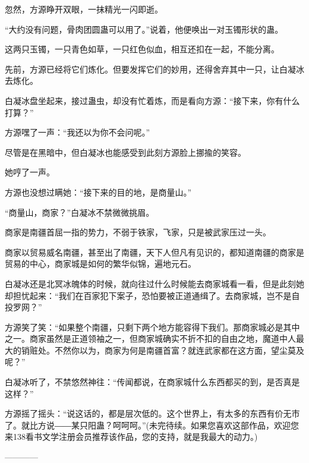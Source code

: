 \begin{this_body}
忽然，方源睁开双眼，一抹精光一闪即逝。

“大约没有问题，骨肉团圆蛊可以用了。”说着，他便唤出一对玉镯形状的蛊。

这两只玉镯，一只青色如草，一只红色似血，相互还扣在一起，不能分离。

先前，方源已经将它们炼化。但要发挥它们的妙用，还得舍弃其中一只，让白凝冰去炼化。

白凝冰盘坐起来，接过蛊虫，却没有忙着炼，而是看向方源：“接下来，你有什么打算？”

方源嘿了一声：“我还以为你不会问呢。”

尽管是在黑暗中，但白凝冰也能感受到此刻方源脸上挪揄的笑容。

她哼了一声。

方源也没想过瞒她：“接下来的目的地，是商量山。”

“商量山，商家？”白凝冰不禁微微挑眉。

商家是南疆首屈一指的势力，不弱于铁家，飞家，只是被武家压过一头。

商家以贸易威名南疆，甚至出了南疆，天下人但凡有见识的，都知道南疆的商家是贸易的中心，商家城是如何的繁华似锦，遍地元石。

白凝冰还是北冥冰魄体的时候，就向往过什么时候能去商家城看一看，但是此刻她却担忧起来：“我们在百家犯下案子，恐怕要被正道通缉了。去商家城，岂不是自投罗网？”

方源笑了笑：“如果整个南疆，只剩下两个地方能容得下我们。那商家城必是其中之一。商家虽然是正道领袖之一，但商家城确实不折不扣的自由之地，魔道中人最大的销赃处。不然你以为，商家为何是南疆首富？就连武家都在这方面，望尘莫及呢？”

白凝冰听了，不禁悠然神往：“传闻都说，在商家城什么东西都买的到，是否真是这样？”

方源摇了摇头：“说这话的，都是层次低的。这个世界上，有太多的东西有价无市了。就比方说――某只阳蛊？呵呵呵。”(未完待续。如果您喜欢这部作品，欢迎您来138看书文学注册会员推荐该作品，您的支持，就是我最大的动力。)

------------

\end{this_body}

